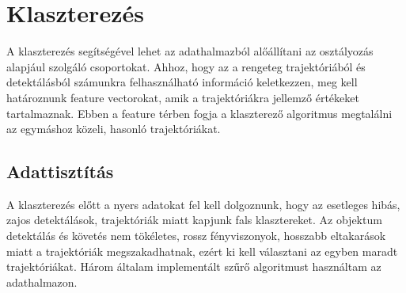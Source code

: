 \documentclass[12pt,a4paper]{article}
\begin{document}
\newpage
\section{Klaszterezés}
A klaszterezés segítségével lehet az adathalmazból alőállítani az osztályozás alapjául szolgáló csoportokat. Ahhoz, hogy az
a rengeteg trajektóriából és detektálásból számunkra felhasználható információ keletkezzen, meg kell határoznunk feature
vectorokat, amik a trajektóriákra jellemző értékeket tartalmaznak. Ebben a feature térben fogja a klaszterező algoritmus
megtalálni az egymáshoz közeli, hasonló trajektóriákat.
\subsection{Adattisztítás}
A klaszterezés előtt a nyers adatokat fel kell dolgoznunk, hogy az esetleges hibás, zajos detektálások, trajektóriák miatt
kapjunk fals klasztereket. Az objektum detektálás és követés nem tökéletes, rossz fényviszonyok, hosszabb eltakarások miatt
a trajektóriák megszakadhatnak, ezért ki kell választani az egyben maradt trajektóriákat. Három általam implementált szűrő algoritmust használtam  
az adathalmazon. 
\end{document}
